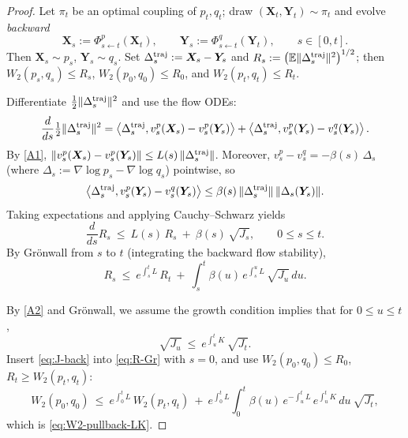\documentclass[12pt]{article}
\theoremstyle{definition} %
\newcommand{\X}{\bm X}
\newcommand{\Y}{\bm Y}
\begin{document}
\begin{proof}
Let $\pi_t$ be an optimal coupling of $p_t,q_t$; draw $(\X_t,\Y_t)\sim\pi_t$ and evolve \emph{backward}
\[
\X_s:=\Phi^p_{s\leftarrow t}(\X_t),\qquad \Y_s:=\Phi^q_{s\leftarrow t}(\Y_t),\qquad s\in[0,t].
\]
Then $\X_s\sim p_s$, $\Y_s\sim q_s$. Set $\Delta_s^{\rm traj}:=\X_s-\Y_s$ and
$R_s:=\big(\mathbb E\|\Delta_s^{\rm traj}\|^2\big)^{1/2}$; then $W_2(p_s,q_s)\le R_s$,
$W_2(p_0,q_0)\le R_0$, and $W_2(p_t,q_t)\le R_t$.

Differentiate $\tfrac12\|\Delta_s^{\rm traj}\|^2$ and use the flow ODEs:
\[
\frac{d}{ds}\tfrac12\|\Delta_s^{\rm traj}\|^2
=\ip{\Delta_s^{\rm traj}}{v^p_s(\X_s)-v^p_s(\Y_s)}
+\ip{\Delta_s^{\rm traj}}{v^p_s(\Y_s)-v^q_s(\Y_s)}.
\]
By \eqref{A1}, $\|v^p_s(\X_s)-v^p_s(\Y_s)\|\le L(s)\,\|\Delta_s^{\rm traj}\|$. Moreover,
$v^p_s-v^q_s=-\beta(s)\,\Delta_s$ (where $\Delta_s := \nabla \log p_s - \nabla \log q_s$) pointwise, so
\[
\ip{\Delta_s^{\rm traj}}{v^p_s(\Y_s)-v^q_s(\Y_s)}
\le \beta(s)\,\|\Delta_s^{\rm traj}\|\,\|\Delta_s(\Y_s)\|.
\]
Taking expectations and applying Cauchy--Schwarz yields
\begin{equation}\label{eq:Rs-ODE}
\frac{d}{ds}R_s\ \le\ L(s)\,R_s\ +\ \beta(s)\,\sqrt{J_s},\qquad 0\le s\le t.
\end{equation}
By Gr\"onwall from $s$ to $t$ (integrating the backward flow stability),
\begin{equation}\label{eq:R-Gr}
R_s \ \le\ e^{\int_s^t L}\,R_t\ +\ \int_s^t \beta(u)\,e^{\int_s^u L}\,\sqrt{J_u}\,du.
\end{equation}

By \eqref{A2} and Gr\"onwall, we assume the growth condition implies that for $0\le u\le t$,
\begin{equation}\label{eq:J-back}
\sqrt{J_u}\ \le\ e^{\int_u^t K}\,\sqrt{J_t}.
\end{equation}
Insert \eqref{eq:J-back} into \eqref{eq:R-Gr} with $s=0$, and use
$W_2(p_0,q_0)\le R_0$, $R_t\ge W_2(p_t,q_t)$:
\[
W_2(p_0,q_0)
\ \le\ e^{\int_0^t L}\,W_2(p_t,q_t)
\ +\ e^{\int_0^t L}\!\int_0^t \beta(u)\,e^{-\int_u^t L}\,e^{\int_u^t K}\,du\ \sqrt{J_t},
\]
which is \eqref{eq:W2-pullback-LK}.
\end{proof}
\end{document}
